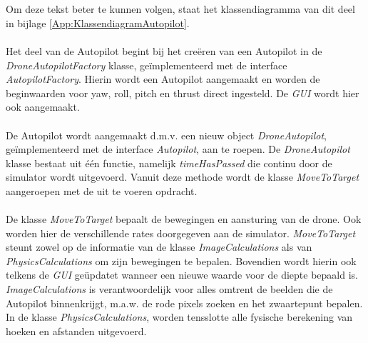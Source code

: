 \\
\\
Om deze tekst beter te kunnen volgen, staat het klassendiagramma van dit deel in bijlage \ref{App:KlassendiagramAutopilot}.
\\
\\
Het deel van de Autopilot begint bij het cre\"eren van een Autopilot in de \textit{DroneAutopilotFactory} klasse, ge\"implementeerd met de interface \textit{AutopilotFactory}. Hierin wordt een Autopilot aangemaakt en worden de beginwaarden voor yaw, roll, pitch en thrust direct ingesteld. De \textit{GUI} wordt hier ook aangemaakt.
\\
\\
De Autopilot wordt aangemaakt d.m.v. een nieuw object \textit{DroneAutopilot}, ge\"implementeerd met de interface \textit{Autopilot}, aan te roepen. De \textit{DroneAutopilot} klasse bestaat uit één functie, namelijk \textit{timeHasPassed} die continu door de simulator wordt uitgevoerd. Vanuit deze methode wordt de klasse \textit{MoveToTarget} aangeroepen met de uit te voeren opdracht.
\\
\\
De klasse \textit{MoveToTarget} bepaalt de bewegingen en aansturing van de drone. Ook worden hier de verschillende rates doorgegeven aan de simulator. \textit{MoveToTarget} steunt zowel op de informatie van de klasse \textit{ImageCalculations} als van \textit{PhysicsCalculations} om zijn bewegingen te bepalen. Bovendien wordt hierin ook telkens de \textit{GUI} ge\"updatet wanneer een nieuwe waarde voor de diepte bepaald is.
\\
\textit{ImageCalculations} is verantwoordelijk voor alles omtrent de beelden die de Autopilot binnenkrijgt, m.a.w. de rode pixels zoeken en het zwaartepunt bepalen.
In de klasse \textit{PhysicsCalculations}, worden tensslotte alle fysische berekening van hoeken en afstanden uitgevoerd.